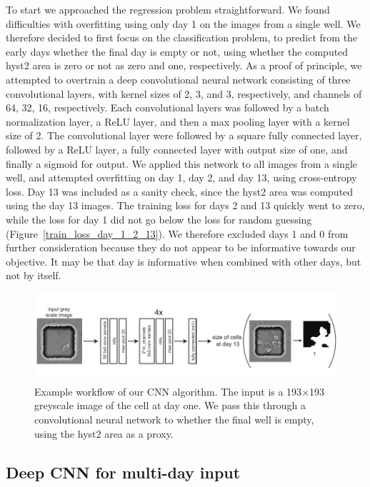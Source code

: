 \documentclass[10pt,twocolumn,letterpaper]{article}
\begin{document}
 To start we approached the regression problem straightforward.  We found difficulties with overfitting using only day 1 on the images from a single well.  We therefore decided to first focus on the classification problem, to predict from the early days whether the final day is empty or not, using whether the computed hyst2 area is zero or not as zero and one, respectively.   As a proof of principle, we attempted to overtrain a deep convolutional neural network consisting of three convolutional layers, with kernel sizes of 2, 3, and 3, respectively, and channels of 64, 32, 16, respectively.  Each convolutional layers was followed by a batch normalization layer, a ReLU layer, and then a max pooling layer with a kernel size of 2.  The convolutional layer were followed by a square fully connected layer, followed by a ReLU layer, a fully connected layer with output size of one, and finally a sigmoid for output.  We applied this network to all images from a single well, and attempted overfitting on day 1, day 2, and day 13, using cross-entropy loss.  Day 13 was included as a sanity check, since the hyst2 area was computed using the day 13 images.  The training loss for days 2 and 13 quickly went to zero, while the loss for day 1 did not go below the loss for random guessing (Figure~\ref{train_loss_day_1_2_13}).  We therefore excluded days 1 and 0 from further consideration because they do not appear to be informative towards our objective.  It may be that day is informative when combined with other days, but not by itself.
 
 \begin{figure}[t!]
\begin{center}
\includegraphics[width=0.8\linewidth]{figures/networkExampleImage_v2.pdf}
\end{center}
   \caption{Example workflow of our CNN algorithm.  The input is a 193$\times$193 greyscale image of the cell at day one.  We pass this through a convolutional neural network to whether the final well is empty, using the hyst2 area as a proxy.}
\label{workflow}
\end{figure}

\subsection{Deep CNN for multi-day input}
\label{multidayCNN}
\end{document}

